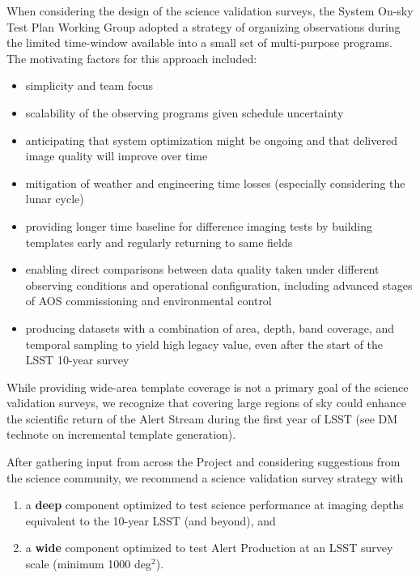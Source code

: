 \documentclass[SE,authoryear,toc,lsstdraft]{lsstdoc}
\begin{document}
When considering the design of the science validation surveys, the System On-sky Test Plan Working Group adopted a strategy of organizing observations during the limited time-window available into a small set of multi-purpose programs.
The motivating factors for this approach included:

\begin{itemize}

  \item simplicity and team focus

  \item scalability of the observing programs given schedule uncertainty

  \item anticipating that system optimization might be ongoing and that delivered image quality will improve over time

  \item mitigation of weather and engineering time losses (especially considering the lunar cycle)

  \item providing longer time baseline for difference imaging tests by building templates early and regularly returning to same fields

  \item enabling direct comparisons between data quality taken under different observing conditions and operational configuration, including advanced stages of AOS commissioning and environmental control

  \item producing datasets with a combination of area, depth, band coverage, and temporal sampling to yield high legacy value, even after the start of the LSST 10-year survey

\end{itemize}

While providing wide-area template coverage is not a primary goal of the science validation surveys, we recognize that covering large regions of sky could enhance the scientific return of the Alert Stream during the first year of LSST (see DM technote on incremental template generation).

After gathering input from across the Project and considering suggestions from the science community, we recommend a science validation survey strategy with

\begin{enumerate}

  \item a \textbf{deep} component optimized to test science performance at imaging depths equivalent to the 10-year LSST (and beyond), and

  \item a \textbf{wide} component optimized to test Alert Production at an LSST survey scale (minimum 1000 deg$^2$).

\end{enumerate}
\end{document}
